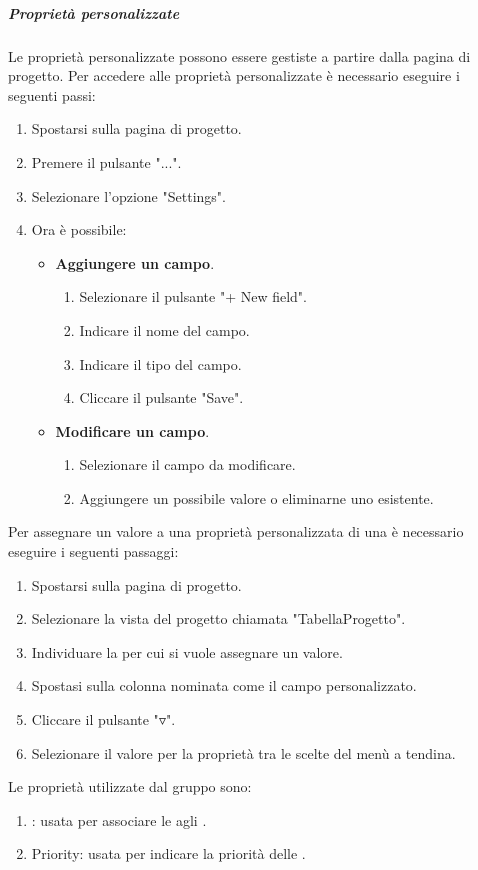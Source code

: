 \subparagraph{Proprietà personalizzate}
\label{subpar:proprietà_personalizzate}
Le proprietà personalizzate possono essere gestiste a partire dalla pagina di progetto.
Per accedere alle proprietà personalizzate è necessario eseguire i seguenti passi:
\begin{enumerate}
    \item Spostarsi sulla pagina di progetto.
    \item Premere il pulsante "...".
    \item Selezionare l'opzione "Settings".
    \item Ora è possibile:
    \begin{itemize}
        \item \textbf{Aggiungere un campo}.
        \begin{enumerate}
            \item Selezionare il pulsante "+ New field".
            \item Indicare il nome del campo.
            \item Indicare il tipo del campo.
            \item Cliccare il pulsante "Save".
        \end{enumerate}

        \item \textbf{Modificare un campo}.
        \begin{enumerate}
            \item  Selezionare il campo da modificare.
            \item Aggiungere un possibile valore o eliminarne uno esistente.
        \end{enumerate}
    \end{itemize}
\end{enumerate}
Per assegnare un valore a una proprietà personalizzata di una  è necessario eseguire i seguenti passaggi:
\begin{enumerate}
    \item Spostarsi sulla pagina di progetto.
    \item Selezionare la vista del progetto chiamata "TabellaProgetto".
    \item Individuare la  per cui si vuole assegnare un valore.
    \item Spostasi sulla colonna nominata come il campo personalizzato.
    \item Cliccare il pulsante "$\triangledown$".
    \item Selezionare il valore per la proprietà tra le scelte del menù a tendina.
\end{enumerate}
Le proprietà utilizzate dal gruppo sono:
\begin{enumerate}
    \item {}: usata per associare le  agli .
    \item Priority: usata per indicare la priorità delle .
\end{enumerate}

